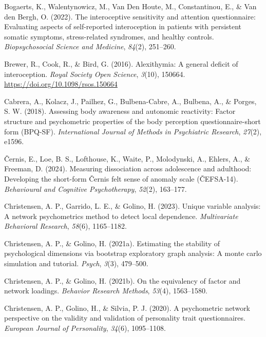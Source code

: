 \documentclass[
  man,
  floatsintext,
  longtable,
  nolmodern,
  notxfonts,
  notimes,
  mask,
  colorlinks=true,linkcolor=blue,citecolor=blue,urlcolor=blue]{apa7}
\newlength{\cslhangindent}
\newenvironment{CSLReferences}[2] %
 {\begin{list}{}{%
  \setlength{\itemindent}{0pt}
  \setlength{\leftmargin}{0pt}
  \setlength{\parsep}{0pt}
  \ifodd #1
   \setlength{\leftmargin}{\cslhangindent}
   \setlength{\itemindent}{-1\cslhangindent}
  \fi
  \setlength{\itemsep}{#2\baselineskip}}}
 {\end{list}}
\begin{document}
\label{refs}
\begin{CSLReferences}{1}{0}
Bogaerts, K., Walentynowicz, M., Van Den Houte, M., Constantinou, E., \&
Van den Bergh, O. (2022). The interoceptive sensitivity and attention
questionnaire: Evaluating aspects of self-reported interoception in
patients with persistent somatic symptoms, stress-related syndromes, and
healthy controls. \emph{Biopsychosocial Science and Medicine},
\emph{84}(2), 251--260.

Brewer, R., Cook, R., \& Bird, G. (2016). Alexithymia: A general deficit
of interoception. \emph{Royal Society Open Science}, \emph{3}(10),
150664. \url{https://doi.org/10.1098/rsos.150664}

Cabrera, A., Kolacz, J., Pailhez, G., Bulbena-Cabre, A., Bulbena, A., \&
Porges, S. W. (2018). Assessing body awareness and autonomic reactivity:
Factor structure and psychometric properties of the body perception
questionnaire-short form (BPQ-SF). \emph{International Journal of
Methods in Psychiatric Research}, \emph{27}(2), e1596.

Černis, E., Loe, B. S., Lofthouse, K., Waite, P., Molodynski, A.,
Ehlers, A., \& Freeman, D. (2024). Measuring dissociation across
adolescence and adulthood: Developing the short-form {Č}ernis felt sense
of anomaly scale ({Č}EFSA-14). \emph{Behavioural and Cognitive
Psychotherapy}, \emph{52}(2), 163--177.

Christensen, A. P., Garrido, L. E., \& Golino, H. (2023). Unique
variable analysis: A network psychometrics method to detect local
dependence. \emph{Multivariate Behavioral Research}, \emph{58}(6),
1165--1182.

Christensen, A. P., \& Golino, H. (2021a). Estimating the stability of
psychological dimensions via bootstrap exploratory graph analysis: A
monte carlo simulation and tutorial. \emph{Psych}, \emph{3}(3),
479--500.

Christensen, A. P., \& Golino, H. (2021b). On the equivalency of factor
and network loadings. \emph{Behavior Research Methods}, \emph{53}(4),
1563--1580.

Christensen, A. P., Golino, H., \& Silvia, P. J. (2020). A psychometric
network perspective on the validity and validation of personality trait
questionnaires. \emph{European Journal of Personality}, \emph{34}(6),
1095--1108.


\end{CSLReferences}
\end{document}

